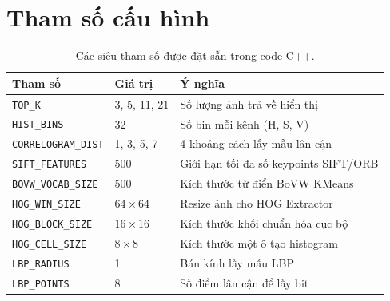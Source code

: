 \chapter{Tham số cấu hình}

\begin{table}[H]
\centering
\begin{tabularx}{\textwidth}{|l|l|X|}
\hline
\textbf{Tham số} & \textbf{Giá trị} & \textbf{Ý nghĩa} \\
\hline
\texttt{TOP\_K} & 3, 5, 11, 21 & Số lượng ảnh trả về hiển thị \\
\hline
\texttt{HIST\_BINS} & 32 & Số bin mỗi kênh (H, S, V) \\
\hline
\texttt{CORRELOGRAM\_DIST} & 1, 3, 5, 7 & 4 khoảng cách lấy mẫu lân cận \\
\hline
\texttt{SIFT\_FEATURES} & 500 & Giới hạn tối đa số keypoints SIFT/ORB \\
\hline
\texttt{BOVW\_VOCAB\_SIZE} & 500 & Kích thước từ điển BoVW KMeans \\
\hline
\texttt{HOG\_WIN\_SIZE} & $64 \times 64$ & Resize ảnh cho HOG Extractor \\
\hline
\texttt{HOG\_BLOCK\_SIZE} & $16 \times 16$ & Kích thước khối chuẩn hóa cục bộ \\
\hline
\texttt{HOG\_CELL\_SIZE} & $8 \times 8$ & Kích thước một ô tạo histogram \\
\hline
\texttt{LBP\_RADIUS} & 1 & Bán kính lấy mẫu LBP \\
\hline
\texttt{LBP\_POINTS} & 8 & Số điểm lân cận để lấy bit \\
\hline
\end{tabularx}
\caption{Các siêu tham số được đặt sẵn trong code C++.}
\end{table}
